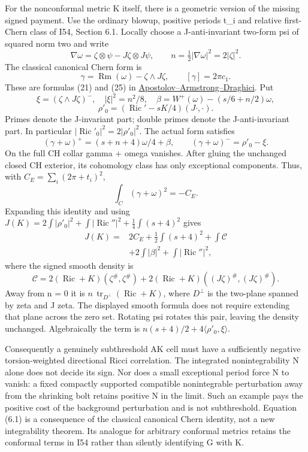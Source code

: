 \documentclass[
  10pt,
]{article}
\begin{document}
For the nonconformal metric K itself, there is a geometric version of
the missing signed payment. Use the ordinary blowup, positive periods
t\_i and relative first-Chern class of I54, Section 6.1. Locally choose
a J-anti-invariant two-form psi of squared norm two and write \[
 \nabla\omega=\zeta\otimes\psi-J\zeta\otimes J\psi,\qquad
 n=\tfrac12|\nabla\omega|^2=2|\zeta|^2.
\] The classical canonical Chern form is \[
 \gamma=\operatorname{Rm}(\omega)-\zeta\wedge J\zeta,\qquad
 [\gamma]=2\pi c_1.
\] These are formulas (21) and (25) in
\href{https://faculty.fiu.edu/~draghici/research/paperfiles/Math-Ann.pdf}{Apostolov--Armstrong--Draghici}.
Put \[
 \xi=(\zeta\wedge J\zeta)^-,\quad |\xi|^2=n^2/8,\quad
 \beta=W^+(\omega)-(s/6+n/2)\omega,
\] \[
 \rho'_0=(\operatorname{Ric}'-sK/4)(J\cdot,\cdot).
\] Primes denote the J-invariant part; double primes denote the
J-anti-invariant part. In particular
\(|\operatorname{Ric}'_0|^2=2|\rho'_0|^2\). The actual form satisfies \[
 (\gamma+\omega)^+=(s+n+4)\omega/4+\beta,\qquad
 (\gamma+\omega)^-=\rho'_0-\xi.
\] On the full CH collar gamma + omega vanishes. After gluing the
unchanged closed CH exterior, its cohomology class has only exceptional
components. Thus, with \(C_E=\sum_i(2\pi+t_i)^2\), \[
                    \int_C(\gamma+\omega)^2=-C_E.
\] Expanding this identity and using
\(J(K)=2\int|\rho'_0|^2+\int|\operatorname{Ric}''|^2 +\tfrac14\int(s+4)^2\)
gives \[
 \boxed{\begin{aligned}
 J(K)={}&2C_E+\tfrac12\int(s+4)^2+\int\mathcal C\\
        &+2\int|\beta|^2+\int|\operatorname{Ric}''|^2,
 \end{aligned}}                                                   \tag{6.1}
\] where the signed smooth density is \[
 \mathcal C=2(\operatorname{Ric}+K)(\zeta^\#,\zeta^\#)
       +2(\operatorname{Ric}+K)((J\zeta)^\#,(J\zeta)^\#).
\] Away from n = 0 it is
\(n\,\operatorname{tr}_{D^\perp}(\operatorname{Ric}+K)\), where
\(D^\perp\) is the two-plane spanned by zeta and J zeta. The displayed
smooth formula does not require extending that plane across the zero
set. Rotating psi rotates this pair, leaving the density unchanged.
Algebraically the term is \(n(s+4)/2+4\langle\rho'_0,\xi\rangle\).

Consequently a genuinely subthreshold AK cell must have a sufficiently
negative torsion-weighted directional Ricci correlation. The integrated
nonintegrability N alone does not decide its sign. Nor does a small
exceptional period force N to vanish: a fixed compactly supported
compatible nonintegrable perturbation away from the shrinking bolt
retains positive N in the limit. Such an example pays the positive cost
of the background perturbation and is not subthreshold. Equation (6.1)
is a consequence of the classical canonical Chern identity, not a new
integrability theorem. Its analogue for arbitrary conformal metrics
retains the conformal terms in I54 rather than silently identifying G
with K.
\end{document}
